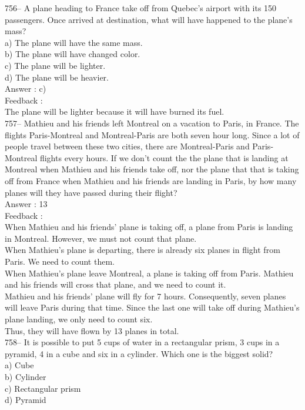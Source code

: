 \documentclass[letterpaper, 12pt]{article}
\begin{document}
756-- A plane heading to France take off from Quebec's airport with its 150 passengers. Once arrived at destination, what will have happened to the plane's mass?\\
a) The plane will have the same mass.\\
b) The plane will have changed color.\\
c) The plane will be lighter.\\
d) The plane will be heavier.\\

Answer : c)\\

Feedback : \\
The plane will be lighter because it will have burned its fuel.\\

757-- Mathieu and his friends left Montreal on a vacation to Paris, in France. The flights Paris-Montreal and Montreal-Paris are both seven hour long.  Since a lot of people travel between these two cities, there are Montreal-Paris and Paris-Montreal flights every hours. If we don't count the the plane that is landing at Montreal when Mathieu and his friends take off, nor the plane that that is taking off from France when Mathieu and his friends are landing in Paris, by how many planes will they have passed during their flight?\\

Answer : 13\\

Feedback : \\
When Mathieu and his friends' plane is taking off, a plane from Paris is landing in Montreal. However, we must not count that plane.\\
When Mathieu's plane is departing, there is already six planes in flight from Paris. We need to count them.\\
When Mathieu's plane leave Montreal, a plane is taking off from Paris. Mathieu and his friends will cross that plane, and we need to count it.\\
Mathieu and his friends' plane will fly for 7 hours. Consequently, seven planes will leave Paris during that time. Since the last one will take off during Mathieu's plane landing, we only need to count six.\\
Thus, they will have flown by 13 planes in total.  \\

758-- It is possible to put 5 cups of water in a rectangular prism, 3 cups in a pyramid, 4 in a cube and six in a cylinder. Which one is the biggest solid?\\
a) Cube\\
b) Cylinder\\
c) Rectangular prism\\
d) Pyramid\\
\end{document}
